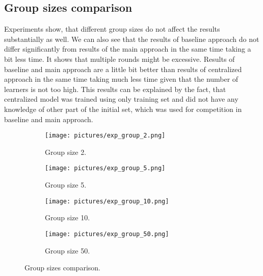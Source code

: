 \documentclass{scrartcl}
\begin{document}
\subsection{Group sizes comparison}
Experiments show, that different group sizes do not affect the results substantially as well. We can also see that the results of baseline approach do not differ significantly from results of the main approach in the same time taking a bit less time. It shows that multiple rounds might be excessive. Results of baseline and main approach are a little bit better than results of centralized approach in the same time taking much less time given that the number of learners is not too high. This results can be explained by the fact, that centralized model was trained using only training set and did not have any knowledge of other part of the initial set, which was used for competition in baseline and main approach.

\begin{figure}[H]
  \centering
  \begin{subfigure}[b]{0.45\linewidth}
    \texttt{[image: pictures/exp\_group\_2.png]}
    \caption{Group size 2.}
  \end{subfigure}\hfill%
  \begin{subfigure}[b]{0.45\linewidth}
    \texttt{[image: pictures/exp\_group\_5.png]}
    \caption{Group size 5.}
  \end{subfigure}
    \begin{subfigure}[b]{0.45\linewidth}
    \texttt{[image: pictures/exp\_group\_10.png]}
    \caption{Group size 10.}
  \end{subfigure}\hfill%
      \begin{subfigure}[b]{0.45\linewidth}
    \texttt{[image: pictures/exp\_group\_50.png]}
    \caption{Group size 50.}
  \end{subfigure}
  \caption{ Group sizes comparison.}
  \label{fig:groups}
\end{figure}
\end{document}
